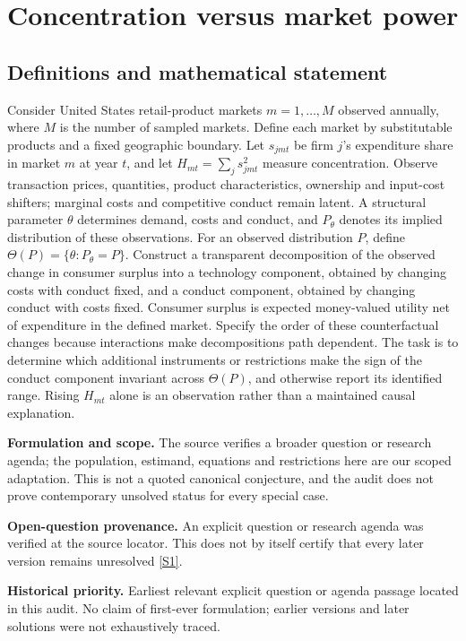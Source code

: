 \documentclass[11pt]{article}
\newcommand{\sref}[2]{\hyperlink{source:#1:#2}{[S#2]}}
\begin{document}
\section*{Concentration versus market power}\label{30007672}
\subsection{Definitions and mathematical statement}
Consider United States retail-product markets \(m=1,\ldots,M\) observed annually, where \(M\) is the number of sampled markets. Define each market by substitutable products and a fixed geographic boundary. Let \(s_{jmt}\) be firm \(j\)'s expenditure share in market \(m\) at year \(t\), and let \(H_{mt}=\sum_j s_{jmt}^{2}\) measure concentration. Observe transaction prices, quantities, product characteristics, ownership and input-cost shifters; marginal costs and competitive conduct remain latent. A structural parameter \(\theta\) determines demand, costs and conduct, and \(P_\theta\) denotes its implied distribution of these observations. For an observed distribution \(P\), define \(\Theta(P)=\{\theta:P_\theta=P\}\). Construct a transparent decomposition of the observed change in consumer surplus into a technology component, obtained by changing costs with conduct fixed, and a conduct component, obtained by changing conduct with costs fixed. Consumer surplus is expected money-valued utility net of expenditure in the defined market. Specify the order of these counterfactual changes because interactions make decompositions path dependent. The task is to determine which additional instruments or restrictions make the sign of the conduct component invariant across \(\Theta(P)\), and otherwise report its identified range. Rising \(H_{mt}\) alone is an observation rather than a maintained causal explanation.

\par\textbf{Formulation and scope.} The source verifies a broader question or research agenda; the population, estimand, equations and restrictions here are our scoped adaptation. This is not a quoted canonical conjecture, and the audit does not prove contemporary unsolved status for every special case.

\par\textbf{Open-question provenance.} An explicit question or research agenda was verified at the source locator. This does not by itself certify that every later version remains unresolved \sref{30007672}{1}.

\par\textbf{Historical priority.} Earliest relevant explicit question or agenda passage located in this audit. No claim of first-ever formulation; earlier versions and later solutions were not exhaustively traced.
\end{document}
